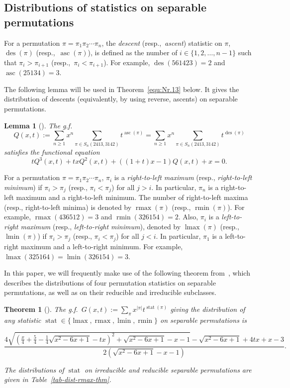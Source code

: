 \documentclass[12pt]{article}
\DeclareMathOperator{\asc}{asc}
\DeclareMathOperator{\des}{des}
\DeclareMathOperator{\rmax}{rmax}
\DeclareMathOperator{\lmax}{lmax}
\DeclareMathOperator{\rmin}{rmin}
\DeclareMathOperator{\lmin}{lmin}
\newtheorem{thm}{Theorem}
\newtheorem{lemma}{Lemma}
\begin{document}
\subsection{Distributions of statistics on separable permutations}
For a permutation $\pi = \pi_1\pi_2\cdots \pi_n$, the \emph{descent} (resp.,\ \emph{ascent}) statistic on $\pi$, $\des(\pi)$ (resp.,\ $\asc(\pi)$), is defined as the number of $i \in \{1,2,\ldots,n-1\}$ such that $\pi_i > \pi_{i+1}$ (resp.,\ $\pi_i < \pi_{i+1}$). For example, $\des(561423)=2$ and $\asc(25134)=3$.

The following lemma will be used in Theorem~\ref{equ:Nr.13} below. It gives the distribution of descents (equivalently, by using reverse, ascents) on separable permutations.

\begin{lemma}[{\cite[Cor.~2.4]{fu2018two}}]\label{Sxt}
  The g.f.
  $$Q(x,t):=\sum_{n\ge1} x^n \sum_{\pi\in S_n(2413,3142)}
  t^{\asc(\pi)}=\sum_{n\ge1} x^n \sum_{\pi\in S_n(2413,3142)}
  t^{\des(\pi)}$$ satisfies the functional equation
  \begin{equation}\label{eq:Stq}
  	tQ^3(x,t) + txQ^2(x,t) + ((1+t)x - 1)Q(x,t) + x = 0. 
  \end{equation}
\end{lemma}
For a permutation $\pi = \pi_1 \pi_2 \cdots \pi_n$, 
$\pi_i$ is a \emph{right-to-left maximum} (resp., \emph{right-to-left minimum}) 
if $\pi_i > \pi_j$ (resp., $\pi_i < \pi_j$) for all $j > i$. In particular, $\pi_n$ is a right-to-left maximum and a right-to-left minimum. 
The number of right-to-left maxima (resp., right-to-left minima) is denoted by $\rmax(\pi)$ (resp., $\rmin(\pi)$). 
For example, $\rmax(436512) = 3$ and $\rmin(326154) = 2$. 
Also, $\pi_i$ is a \emph{left-to-right maximum} (resp., \emph{left-to-right minimum}), denoted by $\lmax(\pi)$ (resp., $\lmin(\pi)$) if $\pi_i > \pi_j$ (resp., $\pi_i < \pi_j$) for all $j < i$. In particular, $\pi_1$ is a left-to-right maximum and a left-to-right minimum. For example, $\lmax(325164) = \lmin(326154) = 3$.

In this paper, we will frequently make use of the following theorem from~\cite{CKZ2024}, which describes the distributions of four permutation statistics on separable permutations, as well as on their reducible and irreducible subclasses.

\begin{thm}[{\cite[Thm.~5]{CKZ2024}}]\label{four-stat}
	The g.f.\ $G(x,t) := \sum_{\pi} x^{|\pi|} t^{\operatorname{stat}(\pi)}$ 
	giving the distribution of any statistic 
	$\operatorname{stat} \in \{\lmax, \rmax, \lmin, \rmin\}$ 
	on separable permutations is
	\begin{small}
	\begin{equation}\label{eq:four-stat}
\frac{4\sqrt{\left(\frac{x}{4}+\frac{5}{4}-\frac{1}{4} \sqrt{x^2-6 x+1}-tx\right)^2+\sqrt{x^2-6 x+1}-x-1}-\sqrt{x^2-6 x+1}+4t x+x - 3}{2 \left(\sqrt{x^2-6 x+1}-x-1\right)}.
	\end{equation}
	\end{small}
	The distributions of $\operatorname{stat}$ on irreducible and reducible separable permutations 
	are given in Table~\ref{tab-dist-rmax-thm}.
\end{thm}
\end{document}
